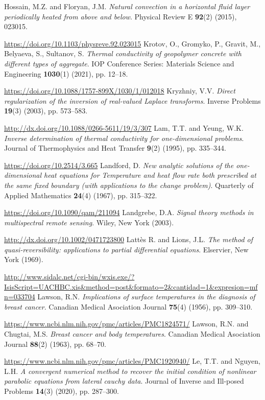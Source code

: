 \begin{thebibliography}{301}
%
 Hossain, M.Z. and Floryan, J.M. {\it Natural convection in a horizontal fluid layer periodically heated from above and below}. Physical Review E {\bf 92}(2) (2015), 023015.

\url{https://doi.org/10.1103/physreve.92.023015}
%
%
 Krotov, O., Gromyko, P., Gravit, M., Belyaeva, S., Sultanov, S. {\it Thermal conductivity of geopolymer concrete with different types of aggregate}. IOP Conference Series: Materials Science and Engineering {\bf 1030}(1) (2021), pp. 12--18.

\url{https://doi.org/10.1088/1757-899X/1030/1/012018}
%
%
 Kryzhniy, V.V. {\it Direct regularization of the inversion of real-valued Laplace transforms}. Inverse Problems {\bf 19}(3) (2003), pp. 573--583.

\url{http://dx.doi.org/10.1088/0266-5611/19/3/307}
%
%
 Lam, T.T. and Yeung, W.K. {\it Inverse determination of thermal conductivity for one-dimensional problems}. Journal of Thermophysics and Heat Transfer {\bf 9}(2) (1995), pp. 335--344.

\url{https://doi.org/10.2514/3.665}
%
%
 Landford, D. {\it New analytic solutions of the one-dimensional heat equations for Temperature and heat flow rate both prescribed at the same fixed boundary (with applications to the change problem)}. Quarterly of Applied Mathematics {\bf 24}(4) (1967), pp. 315--322.

\url{https://doi.org/10.1090/qam/211094}
%
%
 Landgrebe, D.A. {\it Signal theory methods in multispectral remote sensing}. Wiley, New York (2003).

\url{http://dx.doi.org/10.1002/0471723800}
%
%
 Latt\`es R. and Lions, J.L. {\it The method of quasi-reversibility: applications to partial differential equations}. Elservier, New York (1969).

\url{http://www.sidalc.net/cgi-bin/wxis.exe/?IsisScript=UACHBC.xis&method=post&formato=2&cantidad=1&expresion=mfn=033704}
%
%
 Lawson, R.N. {\it Implications of surface temperatures in the diagnosis of breast cancer}. Canadian Medical Asociation Journal {\bf 75}(4) (1956), pp. 309--310.

\url{https://www.ncbi.nlm.nih.gov/pmc/articles/PMC1824571/}
%
%
 Lawson, R.N. and Chugtai, M.S. {\it Breast cancer and body temperatures}. Canadian Medical Asociation Journal {\bf 88}(2) (1963), pp. 68--70.

\url{https://www.ncbi.nlm.nih.gov/pmc/articles/PMC1920940/}
%
%
 Le, T.T. and Nguyen, L.H. {\it A convergent numerical method to recover the initial condition of nonlinear parabolic equations from lateral cauchy data}. Journal of Inverse and Ill-posed Problems {\bf 14}(3) (2020), pp. 287--300.


\end{thebibliography}
